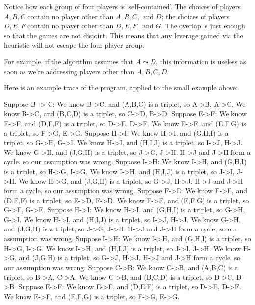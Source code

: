 \documentclass[12pt,x11names, rgb]{article}
\begin{document}
    Notice how each group of four players is `self-contained'. The choices of players $A,B,C$ contain no player other than $A,B,C, \text{ and } D$; the choices of players $D, E, F$ contain no player other than $D, E, F, \text{ and } G$. The overlap is just enough so that the games are not disjoint. This means that any leverage gained via the heuristic will not escape the four player group.

    For example, if the algorithm assumes that $A \leadsto D$, this information is useless as soon as we're addressing players other than $A,B,C,D$.

    Here is an example trace of the program, applied to the small example above:
    \begin{verbatimtab}
Suppose B -> C:
    We know B->C, and (A,B,C) is a triplet, so A->B, A->C.
    We know B->C, and (B,C,D) is a triplet, so C->D, B->D.
    Suppose E->F:
        We know E->F, and (D,E,F) is a triplet, so D->E, D->F.
        We know E->F, and (E,F,G) is a triplet, so F->G, E->G.
        Suppose H->I:
            We know H->I, and (G,H,I) is a triplet, so G->H, G->I.
            We know H->I, and (H,I,J) is a triplet, so I->J, H->J.
            We know G->H, and (J,G,H) is a triplet, so J->G, J->H.
            H->J and J->H form a cycle, so our assumption was wrong.
        Suppose I->H:
            We know I->H, and (G,H,I) is a triplet, so H->G, I->G.
            We know I->H, and (H,I,J) is a triplet, so J->I, J->H.
            We know H->G, and (J,G,H) is a triplet, so G->J, H->J.
            H->J and J->H form a cycle, so our assumption was wrong.
    Suppose F->E:
        We know F->E, and (D,E,F) is a triplet, so E->D, F->D.
        We know F->E, and (E,F,G) is a triplet, so G->F, G->E.
        Suppose H->I:
            We know H->I, and (G,H,I) is a triplet, so G->H, G->I.
            We know H->I, and (H,I,J) is a triplet, so I->J, H->J.
            We know G->H, and (J,G,H) is a triplet, so J->G, J->H.
            H->J and J->H form a cycle, so our assumption was wrong.
        Suppose I->H:
            We know I->H, and (G,H,I) is a triplet, so H->G, I->G.
            We know I->H, and (H,I,J) is a triplet, so J->I, J->H.
            We know H->G, and (J,G,H) is a triplet, so G->J, H->J.
            H->J and J->H form a cycle, so our assumption was wrong.
Suppose C->B:
    We know C->B, and (A,B,C) is a triplet, so B->A, C->A.
    We know C->B, and (B,C,D) is a triplet, so D->C, D->B.
    Suppose E->F:
        We know E->F, and (D,E,F) is a triplet, so D->E, D->F.
        We know E->F, and (E,F,G) is a triplet, so F->G, E->G.

\end{verbatimtab}
\end{document}
